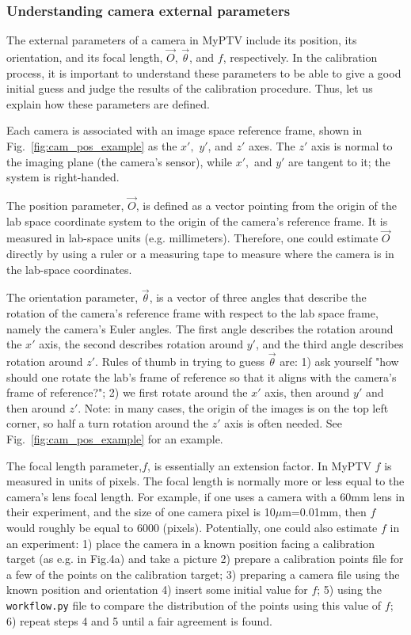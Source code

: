 \documentclass[10pt,a4paper]{article}
\begin{document}
\subsubsection{Understanding camera external parameters} \label{sec:camera_external_params}



The external parameters of a camera in MyPTV include its position, its orientation, and its focal length, $\vec{O}$, $\vec{\theta}$, and $f$, respectively. In the calibration process, it is important to understand these parameters to be able to give a good initial guess and judge the results of the calibration procedure. Thus, let us explain how these parameters are defined.


Each camera is associated with an image space reference frame, shown in Fig.~\ref{fig:cam_pos_example} as the $x',$ $y'$, and $z'$ axes. The $z'$ axis is normal to the imaging plane (the camera's sensor), while $x',$ and $y'$ are tangent to it; the system is right-handed. 


The position parameter, $\vec{O}$, is defined as a vector pointing from the origin of the lab space coordinate system to the origin of the camera's reference frame. It is measured in lab-space units (e.g. millimeters). Therefore, one could estimate $\vec{O}$ directly by using a ruler or a measuring tape to measure where the camera is in the lab-space coordinates. 


The orientation parameter, $\vec{\theta}$, is a vector of three angles that describe the rotation of the camera's reference frame with respect to the lab space frame, namely the camera's Euler angles. The first angle describes the rotation around the $x'$ axis, the second describes rotation around $y'$, and the third angle describes rotation around $z'$. Rules of thumb in trying to guess $\vec{\theta}$ are: 1) ask yourself "how should one rotate the lab's frame of reference so that it aligns with the camera's frame of reference?"; 2) we first rotate around the $x'$ axis, then around $y'$ and then around $z'$. Note: in many cases, the origin of the images is on the top left corner, so half a turn rotation around the $z'$ axis is often needed. See Fig.~\ref{fig:cam_pos_example} for an example.


The focal length parameter,$f$, is essentially an extension factor. In MyPTV $f$ is measured in units of pixels. The focal length is normally more or less equal to the camera's lens focal length. For example, if one uses a camera with a 60mm lens in their experiment, and the size of one camera pixel is 10$\mu$m=0.01mm, then $f$ would roughly be equal to 6000 (pixels). Potentially, one could also estimate $f$ in an experiment: 1) place the camera in a known position facing a calibration target (as e.g. in Fig.4a) and take a picture 2) prepare a calibration points file for a few of the points on the calibration target; 3) preparing a camera file using the known position and orientation 4) insert some initial value for $f$; 5) using the \texttt{workflow.py} file to compare the distribution of the points using this value of $f$; 6) repeat steps 4 and 5 until a fair agreement is found.  
\end{document}
